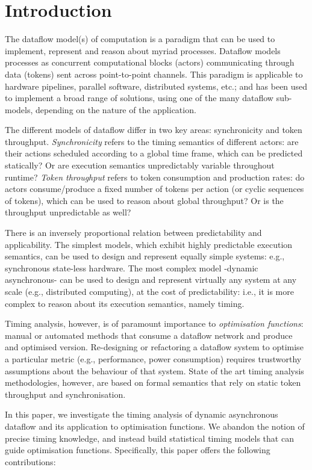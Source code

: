 \section{Introduction}

The dataflow model(s) of computation is a paradigm that can be used to implement, represent and reason about myriad processes. Dataflow models processes as concurrent computational blocks (actors) communicating through data (tokens) sent across point-to-point channels. This paradigm is applicable to hardware pipelines, parallel software, distributed systems, etc.; and has been used to implement a broad range of solutions, using one of the many dataflow sub-models, depending on the nature of the application. 
\par The different models of dataflow differ in two key areas: synchronicity and token throughput. \textit{Synchronicity} refers to the timing semantics of different actors: are their actions scheduled according to a global time frame, which can be predicted statically? Or are execution semantics unpredictably variable throughout runtime? \textit{Token throughput} refers to token consumption and production rates: do actors consume/produce a fixed number of tokens per action (or cyclic sequences of tokens), which can be used to reason about global throughput? Or is the throughput unpredictable as well? 
\par There is an inversely proportional relation between predictability and applicability. The simplest models, which exhibit highly predictable execution semantics, can be used to design and represent equally simple systems: e.g., synchronous state-less hardware. The most complex model -dynamic asynchronous- can be used to design and represent virtually any system at any scale (e.g., distributed computing), at the cost of predictability: i.e., it is more complex to reason about its execution semantics, namely timing.
\par Timing analysis, however, is of paramount importance to \textit{optimisation functions}: manual or automated methods that consume a dataflow network and produce and optimised version. Re-designing or refactoring a dataflow system to optimise a particular metric (e.g., performance, power consumption) requires trustworthy assumptions about the behaviour of that system. State of the art timing analysis methodologies, however, are based on formal semantics that rely on static token throughput and synchronisation. 
\par In this paper, we investigate the timing analysis of dynamic asynchronous dataflow and its application to optimisation functions. We abandon the notion of precise timing knowledge, and instead build statistical timing models that can guide optimisation functions. Specifically, this paper offers the following contributions:

